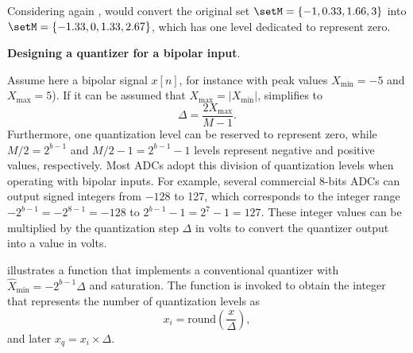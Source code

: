 
Considering again ,  would convert the original set $\setM = \{-1, 0.33, 1.66, 3\}$ into $\setM = \{-1.33, 0, 1.33, 2.67\}$, which has one level dedicated to represent zero.
\eExample

\bExample \textbf{Designing a quantizer for a bipolar input}.
\label{ex:bipolar_quantizer}

Assume here a bipolar signal $x[n]$, for instance with peak values $X_{\textrm{min}}=-5$ and $X_{\textrm{max}} = 5$). 
If it can be assumed that $X_{\textrm{max}} = |X_{\textrm{min}}|$,  simplifies to
\[
\Delta = \frac{2X_{\textrm{max}}}{M-1}.
\]
Furthermore, one quantization level can be reserved to represent zero, while $M/2 = 2^{b-1}$ and $M/2-1 = 2^{b-1}-1$ levels represent negative and positive values, respectively. Most ADCs adopt this division of quantization levels when operating with bipolar inputs.
For example, several commercial 8-bits ADCs can output signed integers from $-128$ to 127, which corresponds to the integer
range $-2^{b-1} = -2^{8-1} = -128$ to $2^{b-1}-1 = 2^{7}-1 = 127$. These integer values can be multiplied by the quantization
step $\Delta$ in volts to convert the quantizer output into a value in volts.

 illustrates a {\matlab} function that implements a conventional quantizer with $\hat X_{\textrm{min}} = -2^{b-1} \Delta$ and saturation. The  function is invoked to obtain the integer that represents the number of quantization levels as
\begin{equation}
x_i = \textrm{round} \left( \frac{x}{\Delta} \right),
\label{eq:quantization_bipolar}
\end{equation}
and later $x_q = x_i \times \Delta$.


